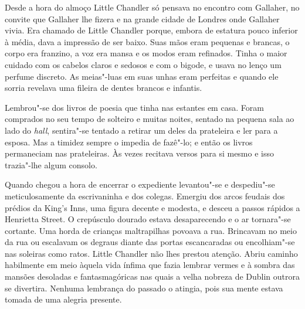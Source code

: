 Desde a hora do almoço Little Chandler só pensava no encontro com Gallaher, no
convite que Gallaher lhe fizera e na grande cidade de Londres onde Gallaher
vivia.  Era chamado de Little Chandler porque, embora de estatura pouco
inferior à média, dava a impressão de ser baixo.  Suas mãos eram pequenas e
brancas, o corpo era franzino, a voz era mansa e os modos eram refinados.
Tinha o maior cuidado com os cabelos claros e sedosos e com o bigode, e usava
no lenço um perfume discreto.  As meias"-luas em suas unhas eram perfeitas e
quando ele sorria revelava uma fileira de dentes brancos e infantis.


Lembrou"-se dos livros de poesia que tinha nas estantes em casa.  Foram
comprados no seu tempo de solteiro e muitas noites, sentado na pequena sala ao
lado do \textit{hall}, sentira"-se tentado a retirar um deles da prateleira e
ler para a esposa.  Mas a timidez sempre o impedia de fazê"-lo; e então os
livros permaneciam nas prateleiras.  Às vezes recitava versos para si mesmo e
isso trazia"-lhe algum consolo.

Quando chegou a hora de encerrar o expediente levantou"-se e despediu"-se
meticulosamente da escrivaninha e dos colegas.  Emergiu dos arcos feudais dos
prédios da King’s Inns, uma figura decente e modesta, e desceu a passos rápidos
a Henrietta Street.  O crepúsculo dourado estava desaparecendo e o ar
tornara"-se cortante.  Uma horda de crianças maltrapilhas povoava a rua.
Brincavam no meio da rua ou escalavam os degraus diante das portas escancaradas
ou encolhiam"-se nas soleiras como ratos.  Little Chandler não lhes prestou
atenção.  Abriu caminho habilmente em meio àquela vida ínfima que fazia lembrar
vermes e à sombra das mansões desoladas e fantasmagóricas nas quais a velha
nobreza de Dublin outrora se divertira.  Nenhuma lembrança do passado o
atingia, pois sua mente estava tomada de uma alegria presente.

